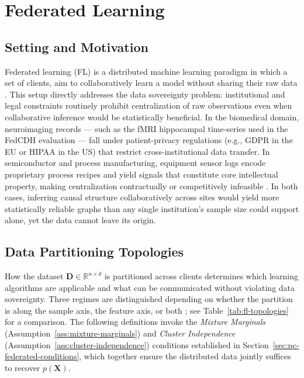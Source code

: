 \section{Federated Learning}\label{sec:fl}

\subsection*{Setting and Motivation}

Federated learning (FL) is a distributed machine learning paradigm in which a set of clients, aim to collaboratively learn a model without sharing their raw data \cite{McMahan2016CommunicationEfficientLO}. This setup directly addresses the data sovereignty problem: institutional and legal constraints routinely prohibit centralization of raw observations even when collaborative inference would be statistically beneficial. In the biomedical domain, neuroimaging records — such as the fMRI hippocampal time-series used in the FedCDH evaluation \cite{Poldrack2015LongtermNA} — fall under patient-privacy regulations (e.g., GDPR in the EU or HIPAA in the US) that restrict cross-institutional data transfer. In semiconductor and process manufacturing, equipment sensor logs encode proprietary process recipes and yield signals that constitute core intellectual property, making centralization contractually or competitively infeasible \cite{Vukovic2022CausalDI}. In both cases, inferring causal structure collaboratively across sites would yield more statistically reliable graphs than any single institution's sample size could support alone, yet the data cannot leave its origin.


\subsection*{Data Partitioning Topologies}
How the dataset $\mathbf{D} \in \mathbb{R}^{n \times d}$ is partitioned across clients determines which learning algorithms are applicable and what can be communicated without violating data sovereignty.
Three regimes are distinguished depending on whether the partition is along the sample axis, the feature axis, or both \cite{Seng2025ScalingPC}; see Table~\ref{tab:fl-topologies} for a comparison.
The following definitions invoke the \emph{Mixture Marginals}
(Assumption~\ref{ass:mixture-marginals}) and \emph{Cluster Independence} (Assumption~\ref{ass:cluster-independence}) conditions established in Section~\ref{sec:pc-federated-conditions}, which together ensure the distributed data jointly suffices to recover $p(\mathbf{X})$.

